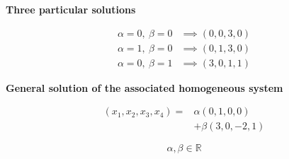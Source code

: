 \begin{answer}
    \textbf{Three particular solutions}

    $$
    \begin{aligned}
    \alpha=0,\ \beta=0
    &\implies (0,0,3,0)\\
    \alpha=1,\ \beta=0
    &\implies (0,1,3,0)\\
    \alpha=0,\ \beta=1
    &\implies (3,0,1,1)
    \end{aligned}
    $$

    \textbf{General solution of the
    associated homogeneous system}

    $$
    \boxed{
    \begin{aligned}
    (x_1,x_2,x_3,x_4)
    ={}&\alpha(0,1,0,0)\\
       &+\beta(3,0,-2,1)
    \end{aligned}
    }
    $$

    $$
    \alpha,\beta\in\mathbb R
    $$
\end{answer}
